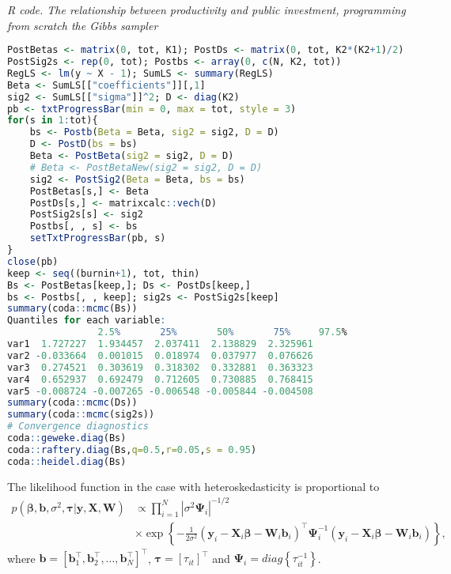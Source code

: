 \begin{enumerate}[leftmargin=*]
\begin{tcolorbox}[enhanced,width=4.67in,center upper,
	fontupper=\large\bfseries,drop shadow southwest,sharp corners]
	\textit{R code. The relationship between productivity and public investment, programming from scratch the Gibbs sampler}
	\begin{VF}
		\begin{lstlisting}[language=R]
PostBetas <- matrix(0, tot, K1); PostDs <- matrix(0, tot, K2*(K2+1)/2)
PostSig2s <- rep(0, tot); Postbs <- array(0, c(N, K2, tot))
RegLS <- lm(y ~ X - 1); SumLS <- summary(RegLS)
Beta <- SumLS[["coefficients"]][,1]
sig2 <- SumLS[["sigma"]]^2; D <- diag(K2)
pb <- txtProgressBar(min = 0, max = tot, style = 3)
for(s in 1:tot){
	bs <- Postb(Beta = Beta, sig2 = sig2, D = D)
	D <- PostD(bs = bs)
	Beta <- PostBeta(sig2 = sig2, D = D)
	# Beta <- PostBetaNew(sig2 = sig2, D = D)
	sig2 <- PostSig2(Beta = Beta, bs = bs)
	PostBetas[s,] <- Beta
	PostDs[s,] <- matrixcalc::vech(D)
	PostSig2s[s] <- sig2
	Postbs[, , s] <- bs
	setTxtProgressBar(pb, s)
}
close(pb)
keep <- seq((burnin+1), tot, thin)
Bs <- PostBetas[keep,]; Ds <- PostDs[keep,]
bs <- Postbs[, , keep]; sig2s <- PostSig2s[keep]
summary(coda::mcmc(Bs))
Quantiles for each variable:
				2.5%       25%       50%       75%     97.5%
var1  1.727227  1.934457  2.037411  2.138829  2.325961
var2 -0.033664  0.001015  0.018974  0.037977  0.076626
var3  0.274521  0.303619  0.318302  0.332881  0.363323
var4  0.652937  0.692479  0.712605  0.730885  0.768415
var5 -0.008724 -0.007265 -0.006548 -0.005844 -0.004508
summary(coda::mcmc(Ds))
summary(coda::mcmc(sig2s))
# Convergence diagnostics
coda::geweke.diag(Bs)
coda::raftery.diag(Bs,q=0.5,r=0.05,s = 0.95)
coda::heidel.diag(Bs)
\end{lstlisting}
	\end{VF}
\end{tcolorbox}
The likelihood function in the case with heteroskedasticity is proportional to 
	\begin{align*}
		p(\bm{\beta},\bm{b},\sigma^2,\bm{\tau}|\bm{y}, \bm{X},\bm{W}) & \propto \prod_{i=1}^N |\sigma^2 \bm{\Psi}_i|^{-1/2}\\
		&\times \exp\left\{-\frac{1}{2\sigma^2}(\bm{y}_i-\bm{X}_i\bm{\beta}-\bm{W}_i\bm{b}_i)^{\top}\bm{\Psi}^{-1}_i(\bm{y}_i-\bm{X}_i\bm{\beta}-\bm{W}_i\bm{b}_i)\right\},
	\end{align*} 
where $\bm{b}=[\bm{b}_1^{\top}, \bm{b}_2^{\top},\dots, \bm{b}_N^{\top}]^{\top}$, $\bm{\tau}=[\tau_{it}]^{\top}$ and $\bm{\Psi}_i=diag\left\{\tau_{it}^{-1}\right\}$. 


\end{enumerate}

